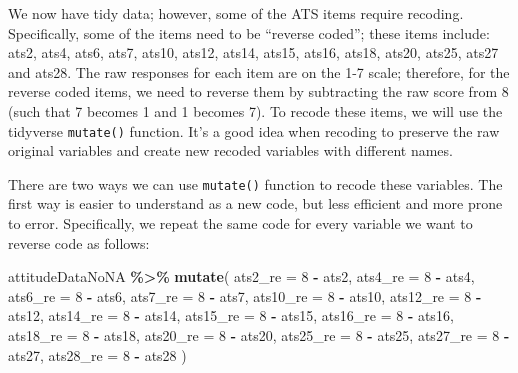 \documentclass[
  12pt,
]{book}
\newenvironment{Shaded}{\begin{snugshade}}{\end{snugshade}}
\newcommand{\AttributeTok}[1]{\textcolor[rgb]{0.13,0.29,0.53}{#1}}
\newcommand{\DecValTok}[1]{\textcolor[rgb]{0.00,0.00,0.81}{#1}}
\newcommand{\FunctionTok}[1]{\textcolor[rgb]{0.13,0.29,0.53}{\textbf{#1}}}
\newcommand{\NormalTok}[1]{#1}
\newcommand{\SpecialCharTok}[1]{\textcolor[rgb]{0.81,0.36,0.00}{\textbf{#1}}}
\begin{document}
We now have tidy data; however, some of the ATS items require recoding. Specifically, some of the items need to be ``reverse coded''; these items include: ats2, ats4, ats6, ats7, ats10, ats12, ats14, ats15, ats16, ats18, ats20, ats25, ats27 and ats28. The raw responses for each item are on the 1-7 scale; therefore, for the reverse coded items, we need to reverse them by subtracting the raw score from 8 (such that 7 becomes 1 and 1 becomes 7). To recode these items, we will use the tidyverse \texttt{mutate()} function. It's a good idea when recoding to preserve the raw original variables and create new recoded variables with different names.

There are two ways we can use \texttt{mutate()} function to recode these variables. The first way is easier to understand as a new code, but less efficient and more prone to error. Specifically, we repeat the same code for every variable we want to reverse code as follows:

\begin{Shaded}
\begin{Highlighting}[]
\NormalTok{attitudeDataNoNA }\SpecialCharTok{\%\textgreater{}\%} 
  \FunctionTok{mutate}\NormalTok{(}
    \AttributeTok{ats2\_re =} \DecValTok{8} \SpecialCharTok{{-}}\NormalTok{ ats2,}
    \AttributeTok{ats4\_re =} \DecValTok{8} \SpecialCharTok{{-}}\NormalTok{ ats4,}
    \AttributeTok{ats6\_re =} \DecValTok{8} \SpecialCharTok{{-}}\NormalTok{ ats6,}
    \AttributeTok{ats7\_re =} \DecValTok{8} \SpecialCharTok{{-}}\NormalTok{ ats7,}
    \AttributeTok{ats10\_re =} \DecValTok{8} \SpecialCharTok{{-}}\NormalTok{ ats10,}
    \AttributeTok{ats12\_re =} \DecValTok{8} \SpecialCharTok{{-}}\NormalTok{ ats12,}
    \AttributeTok{ats14\_re =} \DecValTok{8} \SpecialCharTok{{-}}\NormalTok{ ats14,}
    \AttributeTok{ats15\_re =} \DecValTok{8} \SpecialCharTok{{-}}\NormalTok{ ats15,}
    \AttributeTok{ats16\_re =} \DecValTok{8} \SpecialCharTok{{-}}\NormalTok{ ats16,}
    \AttributeTok{ats18\_re =} \DecValTok{8} \SpecialCharTok{{-}}\NormalTok{ ats18,}
    \AttributeTok{ats20\_re =} \DecValTok{8} \SpecialCharTok{{-}}\NormalTok{ ats20,}
    \AttributeTok{ats25\_re =} \DecValTok{8} \SpecialCharTok{{-}}\NormalTok{ ats25,}
    \AttributeTok{ats27\_re =} \DecValTok{8} \SpecialCharTok{{-}}\NormalTok{ ats27,}
    \AttributeTok{ats28\_re =} \DecValTok{8} \SpecialCharTok{{-}}\NormalTok{ ats28}
\NormalTok{  ) }
\end{Highlighting}
\end{Shaded}
\end{document}
